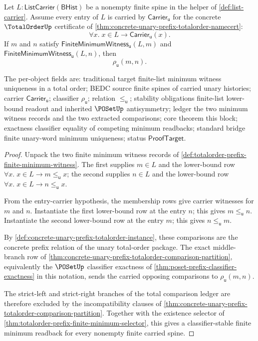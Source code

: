 \begin{theorem}
\label{thm:totalorder-prefix-finite-minimum-classifier-unique}
Let $L:\mathsf{ListCarrier}(\mathsf{BHist})$ be a nonempty finite spine in the helper of \autoref{def:list-carrier}. Assume every entry of $L$ is carried by $\mathsf{Carrier}_{\mathsf{u}}$ for the concrete $\TotalOrderUp$ certificate of \autoref{thm:concrete-unary-prefix-totalorder-namecert}:
$$
\forall x.\; x\in L\to \mathsf{Carrier}_{\mathsf{u}}(x).
$$
If $m$ and $n$ satisfy $\mathsf{FiniteMinimumWitness}_{\mathsf{u}}(L,m)$ and $\mathsf{FiniteMinimumWitness}_{\mathsf{u}}(L,n)$, then
$$
\rho_{\mathsf{u}}(m,n).
$$

The per-object fields are: traditional target finite-list minimum witness uniqueness in a total order; BEDC source finite spines of carried unary histories; carrier $\mathsf{Carrier}_{\mathsf{u}}$; classifier $\rho_{\mathsf{u}}$; relation $\le_{\mathsf{u}}$; stability obligations finite-list lower-bound readout and inherited $\POSetUp$ antisymmetry; ledger the two minimum witness records and the two extracted comparisons; core theorem this block; exactness classifier equality of competing minimum readbacks; standard bridge finite unary-word minimum uniqueness; status $\mathsf{ProofTarget}$.
\end{theorem}
\begin{proof}
Unpack the two finite minimum witness records of \autoref{def:totalorder-prefix-finite-minimum-witness}. The first supplies $m\in L$ and the lower-bound row $\forall x.\; x\in L\to m\le_{\mathsf{u}}x$; the second supplies $n\in L$ and the lower-bound row $\forall x.\; x\in L\to n\le_{\mathsf{u}}x$.

From the entry-carrier hypothesis, the membership rows give carrier witnesses for $m$ and $n$. Instantiate the first lower-bound row at the entry $n$; this gives $m\le_{\mathsf{u}}n$. Instantiate the second lower-bound row at the entry $m$; this gives $n\le_{\mathsf{u}}m$.

By \autoref{def:concrete-unary-prefix-totalorder-instance}, these comparisons are the concrete prefix relation of the unary total-order package. The exact middle-branch row of \autoref{thm:concrete-unary-prefix-totalorder-comparison-partition}, equivalently the $\POSetUp$ classifier exactness of \autoref{thm:poset-prefix-classifier-exactness} in this notation, sends the carried opposing comparisons to $\rho_{\mathsf{u}}(m,n)$.

The strict-left and strict-right branches of the total comparison ledger are therefore excluded by the incompatibility clauses of \autoref{thm:concrete-unary-prefix-totalorder-comparison-partition}. Together with the existence selector of \autoref{thm:totalorder-prefix-finite-minimum-selector}, this gives a classifier-stable finite minimum readback for every nonempty finite carried spine.
\end{proof}

